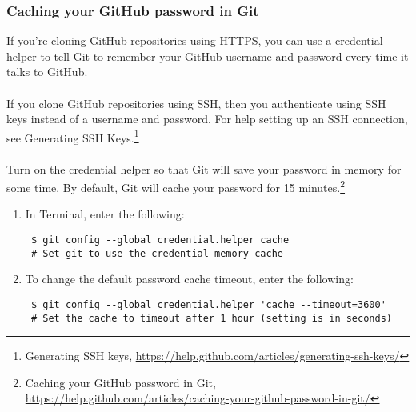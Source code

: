 
\subsubsection{Caching your GitHub password in Git}
If you're cloning GitHub repositories using HTTPS, you can use a
credential helper to tell Git to remember your GitHub username
and password every time it talks to GitHub.
\\
\\
If you clone GitHub repositories using SSH, then you authenticate
using SSH keys instead of a username and password.  For help
setting up an SSH connection, see Generating SSH Keys.\footnote{Generating SSH keys,
\href{https://help.github.com/articles/generating-ssh-keys/}{https://help.github.com/articles/generating-ssh-keys/}}
\\
\\
Turn on the credential helper so that Git will save your password
in memory for some time.  By default, Git will cache your password
for 15 minutes.\footnote{Caching your GitHub password in Git,
\href{https://help.github.com/articles/caching-your-github-password-in-git/}{https://help.github.com/articles/caching-your-github-password-in-git/}}

\begin{enumerate}
  \item{In Terminal, enter the following:
\begin{Verbatim}
 $ git config --global credential.helper cache
 # Set git to use the credential memory cache
\end{Verbatim}
       }
  \item{To change the default password cache timeout, enter the following:
\begin{Verbatim}
 $ git config --global credential.helper 'cache --timeout=3600'
 # Set the cache to timeout after 1 hour (setting is in seconds)
\end{Verbatim}
       }
\end{enumerate}

\noindent {}

